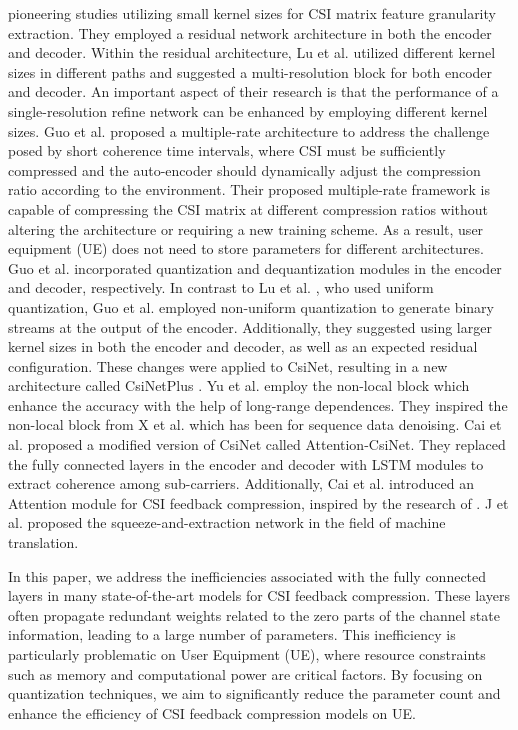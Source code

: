 \documentclass[lettersize,journal]{IEEEtran}
\begin{document}
pioneering studies utilizing small kernel sizes for CSI matrix feature granularity extraction. They employed a residual network architecture in both the encoder and decoder. Within the residual architecture, Lu et al. utilized different kernel sizes in different paths and suggested a multi-resolution block for both encoder and decoder. An important aspect of their research is that the performance of a single-resolution refine network can be enhanced by employing different kernel sizes. Guo et al. \cite{abo} proposed a multiple-rate architecture to address the challenge posed by short coherence time intervals, where CSI must be sufficiently compressed and the auto-encoder should dynamically adjust the compression ratio according to the environment. Their proposed multiple-rate framework is capable of compressing the CSI matrix at different compression ratios without altering the architecture or requiring a new training scheme. As a result, user equipment (UE) does not need to store parameters for different architectures. Guo et al. incorporated quantization and dequantization modules in the encoder and decoder, respectively. In contrast to Lu et al. \cite{abp}, who used uniform quantization, Guo et al.\cite{abo} employed non-uniform quantization to generate binary streams at the output of the encoder. Additionally, they suggested using larger kernel sizes in both the encoder and decoder, as well as an expected residual configuration. These changes were applied to CsiNet, resulting in a new architecture called CsiNetPlus \cite{abo}. Yu et al. \cite{abq} employ the non-local block which enhance the accuracy with the help of long-range dependences. They inspired the non-local block from X et al. \cite{abr} which has been for sequence data denoising. Cai et al. \cite{abs} proposed a modified version of CsiNet called Attention-CsiNet. They replaced the fully connected layers in the encoder and decoder with LSTM modules to extract coherence among sub-carriers. Additionally, Cai et al. \cite{abs} introduced an Attention module for CSI feedback compression, inspired by the research of \cite{abt}. J et al. \cite{abt} proposed the squeeze-and-extraction network in the field of machine translation.

In this paper, we address the inefficiencies associated with the fully connected layers in many state-of-the-art models for CSI feedback compression. These layers often propagate redundant weights related to the zero parts of the channel state information, leading to a large number of parameters. This inefficiency is particularly problematic on User Equipment (UE), where resource constraints such as memory and computational power are critical factors. By focusing on quantization techniques, we aim to significantly reduce the parameter count and enhance the efficiency of CSI feedback compression models on UE.
\end{document}

